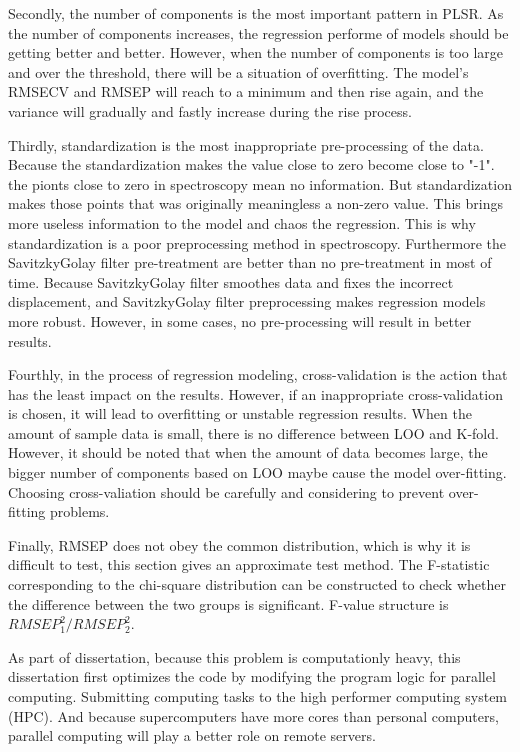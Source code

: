 \documentclass[a4paper,12pt,titlepage]{article} %
\numberwithin{equation}{section}  %
\begin{document}
	Secondly, the number of components is the most important pattern in PLSR. As the number of components increases, the regression performe of models should be getting better and better. However, when the number of components is too large and over the threshold, there will be a situation of overfitting. The model's RMSECV and RMSEP will reach to a minimum and then rise again, and the variance will gradually and fastly increase during the rise process.
	
	Thirdly, standardization is the most inappropriate pre-processing of the data. Because the standardization makes the value close to zero become close to "-1". the pionts close to zero in spectroscopy mean no information. But standardization makes those points that was originally meaningless a non-zero value. This brings more useless information to the model and chaos the regression. This is why standardization is a poor preprocessing method in spectroscopy. Furthermore the SavitzkyGolay filter pre-treatment are better than no pre-treatment in most of time. Because SavitzkyGolay filter smoothes data and fixes the incorrect displacement, and SavitzkyGolay filter preprocessing makes  regression models more robust. However, in some cases, no pre-processing will result in better results. 
	
	Fourthly, in the process of regression modeling, cross-validation is the action that has the least impact on the results. However, if an inappropriate cross-validation is chosen, it will lead to overfitting or unstable regression results. When the amount of sample data is small, there is no difference between LOO and K-fold. However, it should be noted that when the amount of data becomes large, the bigger number of components based on LOO maybe cause the model over-fitting. Choosing cross-valiation should be carefully and considering to prevent over-fitting problems.
	
	Finally, RMSEP does not obey the common distribution, which is why it is difficult to test, this section gives an approximate test method. The F-statistic corresponding to the chi-square distribution can be constructed to check whether the difference between the two groups is significant. F-value structure is $RMSEP_{1}^{2}/RMSEP_{2}^{2}$.
	
	As part of dissertation, because this problem is computationly heavy, this dissertation first optimizes the code by modifying the program logic for parallel computing. Submitting computing tasks to the high performer computing system (HPC). And because supercomputers have more cores than personal computers, parallel computing will play a better role on remote servers.
	
\end{document}
